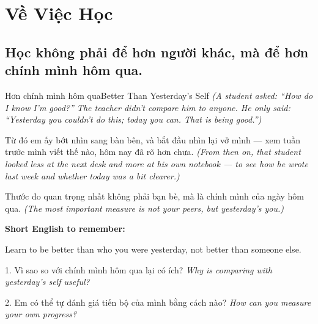 \chapter{Về Việc Học}

\section{Học không phải để hơn người khác, mà để hơn chính mình hôm qua.}
\begin{truyen}{Hơn chính mình hôm qua}{Better Than Yesterday's Self}
\textit{(A student asked: ``How do I know I'm good?'' The teacher didn't compare him to anyone. He only said: ``Yesterday you couldn't do this; today you can. That is being good.'')}

Từ đó em ấy bớt nhìn sang bàn bên, và bắt đầu nhìn lại vở mình — xem tuần trước mình viết thế nào, hôm nay đã rõ hơn chưa.
\textit{(From then on, that student looked less at the next desk and more at his own notebook — to see how he wrote last week and whether today was a bit clearer.)}
\end{truyen}

\begin{baihoc}
Thước đo quan trọng nhất không phải bạn bè, mà là chính mình của ngày hôm qua.
\textit{(The most important measure is not your peers, but yesterday's you.)}
\end{baihoc}

\begin{ghinhoanh}
\textbf{Short English to remember:}

Learn to be better than who you were yesterday, not better than someone else.

\end{ghinhoanh}

\begin{tuhocnhanh}
1. Vì sao so với chính mình hôm qua lại có ích? \textit{Why is comparing with yesterday's self useful?}

2. Em có thể tự đánh giá tiến bộ của mình bằng cách nào? \textit{How can you measure your own progress?}
\end{tuhocnhanh}
\ngancach

